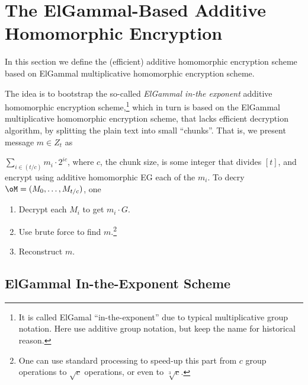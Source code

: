 \section{The ElGammal-Based  Additive Homomorphic Encryption }\label{sec:ChanksEG}
In this section we define the (efficient)  additive homomorphic encryption scheme based on ElGammal multiplicative  homomorphic encryption scheme.  


The idea is to bootstrap the so-called   \textit{ElGammal in-the exponent}   additive homomorphic encryption  scheme,\footnote{It is called ElGamal ``in-the-exponent'' due to typical multiplicative group notation. Here use additive group notation, but keep the name for historical reason.}  which in turn is based on the  ElGammal multiplicative  homomorphic encryption scheme, that lacks efficient decryption algorithm, by splitting the plain text into small ``chunks''. That  is, we present message $m\in Z_t$ as

$\sum_{i \in (t/c)}   m_i \cdot 2^{i c}$, where $c$, the chunk size, is  some integer that divides $[t]$, and encrypt using    additive homomorphic EG each of the $m_i$. To decry $\oM= (M_0,\ldots,M_{t/c})$, one  
\begin{enumerate}
	\item Decrypt   each $M_i$ to get $m_i  \cdot G$.
	\item Use brute force to find $m$.\footnote{One can use standard   processing to speed-up this part from $c$ group operations to $\sqrt{c}$  operations, or even  to   $\sqrt[3]{c}$.}
	
	\item Reconstruct $m$.
\end{enumerate}



\subsection{ElGammal In-the-Exponent Scheme}\label{sec:ChanksEG:EG}
\newcommand{\EgKG}{\MathAlgX{EgGen}}
\newcommand{\EgEnc}{\MathAlgX{EgEnc}}
\newcommand{\EgDec}{\MathAlgX{EgDec}}


